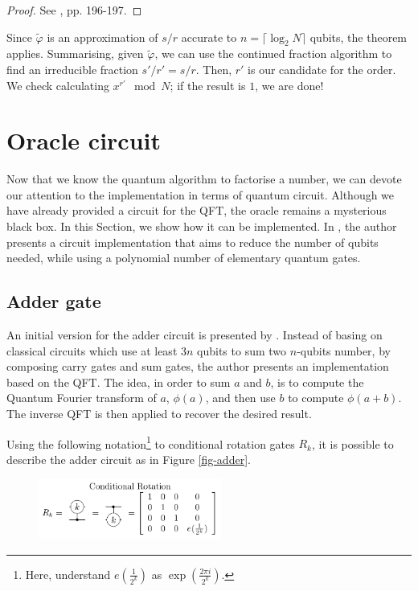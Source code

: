 \documentclass[a4paper, 10pt]{article}
\numberwithin{equation}{section}
\numberwithin{figure}{section}
\numberwithin{table}{section}
\begin{document}
\begin{proof}
	See \cite{hardy}, pp. 196-197.
\end{proof}

Since $\tilde{\varphi}$ is an approximation of $s/r$ accurate to $n=\lceil\log_2N\rceil$ qubits, the theorem applies. Summarising, given $\tilde{\varphi}$, we can use the continued fraction algorithm to find an irreducible fraction $s'/r'=s/r$. Then, $r'$ is our candidate for the order. We check calculating $x^{r'} \mod N$; if the result is $1$, we are done!

\newpage
\section{Oracle circuit}
\label{sec:oracle}

Now that we know the quantum algorithm to factorise a number, we can devote our attention to the implementation in terms of quantum circuit. Although we have already provided a circuit for the QFT, the oracle remains a mysterious black box. In this Section, we show how it can be implemented. In \cite{beauregard}, the author presents a circuit implementation that aims to reduce the number of qubits needed, while using a polynomial number of elementary quantum gates.

\subsection{Adder gate}

An initial version for the adder circuit is presented by \cite{draper}. Instead of basing on classical circuits which use at least $3n$ qubits to sum two $n$-qubits number, by composing carry gates and sum gates, the author presents an implementation based on the QFT. The idea, in order to sum $a$ and $b$, is to compute the Quantum Fourier transform of $a$, $\phi(a)$, and then use $b$ to compute $\phi(a+b)$. The inverse QFT is then applied to recover the desired result.

Using the following notation\footnote{Here, understand $e\left(\frac{1}{2^k}\right)$ as $\exp\left(\frac{2\pi i}{2^k}\right)$.} to conditional rotation gates $R_k$, it is possible to describe the adder circuit as in Figure \ref{fig-adder}.

\begin{figure}[h!]
	\centering
	\includegraphics[width=6cm]{Figures/rotation-k}
\end{figure}
\end{document}
